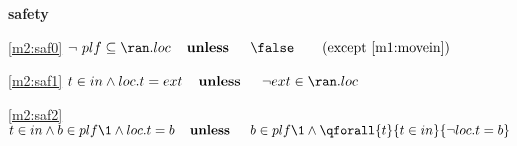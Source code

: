 \textbf{safety}
\begin{block}
\item[ \eqref{m2:saf0} ]$\neg ~ plf \subseteq \ran.loc  \textbf{\quad unless \quad} \false\qquad  \text{(except \ref{m1:movein})}$ %
\item[ \eqref{m2:saf1} ]$t \in in \land loc.t = ext  \textbf{\quad unless \quad} \neg ext \in \ran. loc $ %
\item[ \eqref{m2:saf2} ]$t \in in \land b \in plf \1\land  loc.t = b  \textbf{\quad unless \quad} b \in plf \1\land \qforall{t}{ t \in in }{ \neg loc.t = b } $ %
\end{block}
